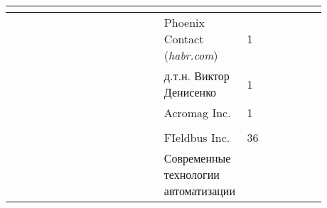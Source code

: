 \begin{center}
\begin{longtable}{|C{0.13\linewidth}|C{0.35\linewidth}|C{0.15\linewidth}|C{0.1\linewidth}|C{0.15\linewidth}|}
		\hline
		\gs &&&&\cite{thomesse_fieldbus_2005}\\
		\hline
		\g && Phoenix Contact (\textit{habr.com})&1&\cite{promwad__2019-1}\\
		\hline 
		\g &&д.т.н. Виктор Денисенко&1&\cite{__2015}\\
		\hline
		\g &&Acromag Inc.&1&\cite{acromag_introduction_2002}\\
		\hline
		\gs &&&&\cite{vincent_foundation_2001}\\
		\hline
		\gs &&FIeldbus Inc.&36&\cite{noauthor_foundation_2001}\\
		\hline
		\gs &&Современ\-ные технологии автоматизации&&\cite{_foundation_1999}\\
		\hline
	\end{longtable}
\end{center}

